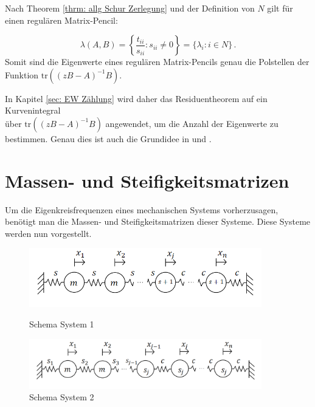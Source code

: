 \documentclass[a4paper,12pt]{report}
\newcommand{\tr}{\text{tr}}
\newcommand{\inv}{^{-1}}
\newcommand{\1}{\mathds{1}}
\theoremstyle{plain} %
\theoremstyle{definition} %
\theoremstyle{remark}
\begin{document}
            Nach Theorem \ref{thrm: allg Schur Zerlegung} und der Definition von $N$ gilt für einen regulären Matrix-Pencil:

            $$\lambda(A, B) = \left\{\frac{t_{ii}}{s_{ii}} : s_{ii}\ne 0\right\} = \{\lambda_i: i\in N\}\,.$$
            Somit sind die Eigenwerte eines regulären Matrix-Pencils genau die Polstellen der Funktion $\tr((zB-A)\inv B)$.

            In Kapitel \ref{sec: EW Zählung} wird daher das Residuentheorem auf ein Kurvenintegral\\
            über $\tr((zB-A)\inv B)$ angewendet, um die Anzahl der Eigenwerte zu bestimmen.
            Genau dies ist auch die Grundidee in \cite{hauptteilTkachuk} und \cite{grundlageFutamura}.
            
\chapter{Massen- und Steifigkeitsmatrizen}
\label{sec: MS Matrizen}

      Um die Eigenkreisfrequenzen eines mechanischen Systems vorherzusagen, benötigt man die Massen- und Steifigkeitsmatrizen dieser Systeme.
      Diese Systeme werden nun vorgestellt.
      \begin{figure}[h!t]
            \centering
            \begin{minipage}[ht]{0.49\linewidth}
                  \centering
                  \includegraphics[width=0.9\textwidth, keepaspectratio]{./System1.png}
                  \caption{Schema System 1}
                  \label{fig: System 1}
            \end{minipage}
            \hfill
            \begin{minipage}[ht]{0.49\linewidth}
                  \centering
                  \includegraphics[width=0.9\textwidth, keepaspectratio]{./System2.png}
                  \caption{Schema System 2}
                  \label{fig: System 2}
            \end{minipage}
      \end{figure}
\end{document}
